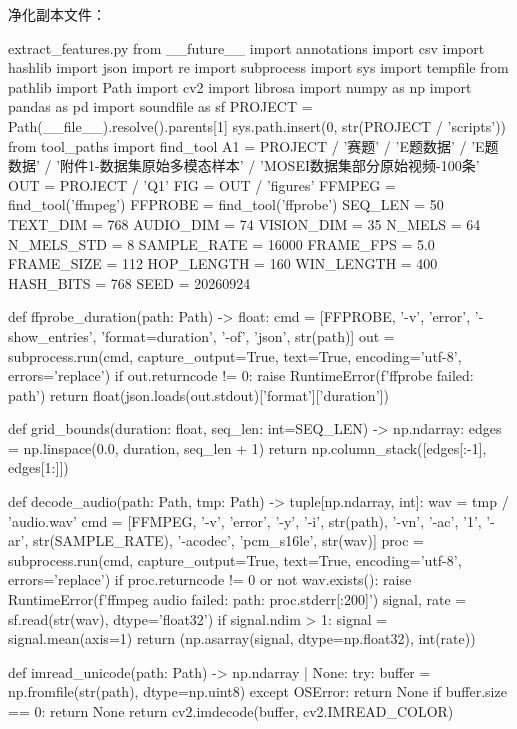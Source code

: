 \documentclass[bwprint]{gmcmthesis}
\begin{document}
\begin{appendices}
净化副本文件：\texttt{}

\begin{Python}{extract\_features.py}
from __future__ import annotations
import csv
import hashlib
import json
import re
import subprocess
import sys
import tempfile
from pathlib import Path
import cv2
import librosa
import numpy as np
import pandas as pd
import soundfile as sf
PROJECT = Path(__file__).resolve().parents[1]
sys.path.insert(0, str(PROJECT / 'scripts'))
from tool_paths import find_tool
A1 = PROJECT / '赛题' / 'E题数据' / 'E题数据' / '附件1-数据集原始多模态样本' / 'MOSEI数据集部分原始视频-100条'
OUT = PROJECT / 'Q1'
FIG = OUT / 'figures'
FFMPEG = find_tool('ffmpeg')
FFPROBE = find_tool('ffprobe')
SEQ_LEN = 50
TEXT_DIM = 768
AUDIO_DIM = 74
VISION_DIM = 35
N_MELS = 64
N_MELS_STD = 8
SAMPLE_RATE = 16000
FRAME_FPS = 5.0
FRAME_SIZE = 112
HOP_LENGTH = 160
WIN_LENGTH = 400
HASH_BITS = 768
SEED = 20260924

def ffprobe_duration(path: Path) -> float:
    cmd = [FFPROBE, '-v', 'error', '-show_entries', 'format=duration', '-of', 'json', str(path)]
    out = subprocess.run(cmd, capture_output=True, text=True, encoding='utf-8', errors='replace')
    if out.returncode != 0:
        raise RuntimeError(f'ffprobe failed: {path}')
    return float(json.loads(out.stdout)['format']['duration'])

def grid_bounds(duration: float, seq_len: int=SEQ_LEN) -> np.ndarray:
    edges = np.linspace(0.0, duration, seq_len + 1)
    return np.column_stack([edges[:-1], edges[1:]])

def decode_audio(path: Path, tmp: Path) -> tuple[np.ndarray, int]:
    wav = tmp / 'audio.wav'
    cmd = [FFMPEG, '-v', 'error', '-y', '-i', str(path), '-vn', '-ac', '1', '-ar', str(SAMPLE_RATE), '-acodec', 'pcm_s16le', str(wav)]
    proc = subprocess.run(cmd, capture_output=True, text=True, encoding='utf-8', errors='replace')
    if proc.returncode != 0 or not wav.exists():
        raise RuntimeError(f'ffmpeg audio failed: {path}: {proc.stderr[:200]}')
    signal, rate = sf.read(str(wav), dtype='float32')
    if signal.ndim > 1:
        signal = signal.mean(axis=1)
    return (np.asarray(signal, dtype=np.float32), int(rate))

def imread_unicode(path: Path) -> np.ndarray | None:
    try:
        buffer = np.fromfile(str(path), dtype=np.uint8)
    except OSError:
        return None
    if buffer.size == 0:
        return None
    return cv2.imdecode(buffer, cv2.IMREAD_COLOR)


\end{Python}
\end{appendices}
\end{document}
